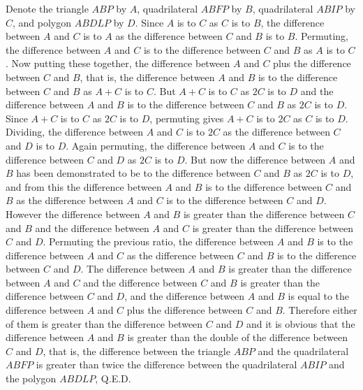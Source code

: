 \documentclass[11pt,letterpaper]{book}
\begin{document}
Denote the triangle $ABP$ by $A$, quadrilateral $ABFP$ by $B$, quadrilateral $ABIP$ by
$C$, and polygon $ABDLP$ by $D$. Since $A$ is to $C$ as $C$ is to $B$, the
difference between $A$ and $C$ is to $A$ as the difference between $C$ and $B$
is to $B$. Permuting, the difference between $A$ and $C$ is to the difference
between $C$ and $B$ as $A$ is to $C$. Now putting these together, the difference
between $A$ and $C$ plus the difference between $C$ and $B$, that is, the
difference between $A$ and $B$ is to the difference between $C$ and $B$ as $A+C$
is to $C$. But $A+C$ is to $C$ as $2C$ is to $D$ and the difference between $A$
and $B$ is to the difference between $C$ and $B$ as $2C$ is to $D$. Since $A+C$
is to $C$ as $2C$ is to $D$, permuting gives $A+C$ is to $2C$ as $C$ is to $D$.
Dividing, the difference between $A$ and $C$ is to $2C$ as the difference
between $C$ and $D$ is to $D$. Again permuting, the difference between $A$ and
$C$ is to the difference between $C$ and $D$ as $2C$ is to $D$. But now the
difference between $A$ and $B$ has been demonstrated to be to the difference
between $C$ and $B$ as $2C$ is to $D$, and from this the difference between $A$
and $B$ is to the difference between $C$ and $B$ as the difference between $A$
and $C$ is to the difference between $C$ and $D$. However the difference between
$A$ and $B$ is greater than the difference between $C$ and $B$ and the
difference between $A$ and $C$ is greater than the difference between $C$ and
$D$. Permuting the previous ratio, the difference between $A$ and $B$ is to the
difference between $A$ and $C$ as the difference between $C$ and $B$ is to the
difference between $C$ and $D$. The difference between $A$ and $B$ is greater
than the difference between $A$ and $C$ and the difference between $C$ and $B$
is greater than the difference between $C$ and $D$, and the difference between
$A$ and $B$ is equal to the difference between $A$ and $C$ plus the difference
between $C$ and $B$. Therefore either of them is greater than the difference
between $C$ and $D$ and it is obvious that the difference between $A$ and $B$ is
greater than the double of the difference between $C$ and $D$, that is, the
difference between the triangle $ABP$ and the quadrilateral $ABFP$ is greater than twice
the difference between the quadrilateral $ABIP$ and the polygon $ABDLP$, Q.E.D.
\end{document}
